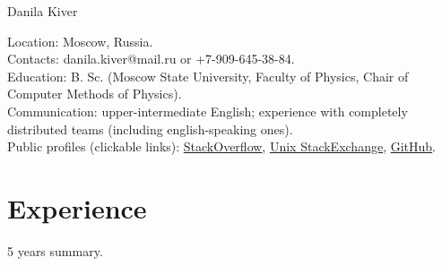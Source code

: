 \documentclass[letterpaper, 11pt]{article}
\begin{document}
    \noindent
    \Huge
    Danila Kiver \\
    \normalsize

    \noindent
    Location: Moscow, Russia. \\

    \noindent
    Contacts: danila.kiver@mail.ru or +7-909-645-38-84. \\

    \noindent
    Education: B. Sc. (Moscow State University, Faculty of Physics, Chair of Computer Methods of Physics). \\

    \noindent
    Communication: upper-intermediate English; experience with completely distributed teams (including english-speaking ones). \\

    \noindent
    Public profiles (clickable links): \href{https://stackoverflow.com/users/7191047/danila-kiver}{StackOverflow}, \href{https://unix.stackexchange.com/users/297621/danila-kiver}{Unix StackExchange}, \href{https://github.com/QazerLab}{GitHub}.





    \section{Experience}

    5 years summary.
\end{document}

